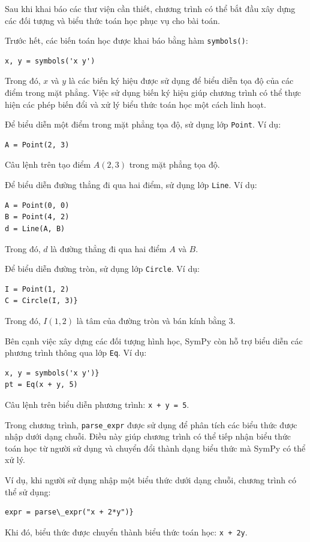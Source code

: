 \documentclass[12pt,a4paper]{article}
\begin{document}
Sau khi khai báo các thư viện cần thiết, chương trình có thể bắt đầu xây dựng các đối tượng và biểu thức toán học phục vụ cho bài toán.

Trước hết, các biến toán học được khai báo bằng hàm \texttt{symbols()}: 
\begin{lstlisting}
x, y = symbols('x y')
\end{lstlisting}
Trong đó, $x$ và $y$ là các biến ký hiệu được sử dụng để biểu diễn tọa độ của các điểm trong mặt phẳng. Việc sử dụng biến ký hiệu giúp chương trình có thể thực hiện các phép biến đổi và xử lý biểu thức toán học một cách linh hoạt.

Để biểu diễn một điểm trong mặt phẳng tọa độ, sử dụng lớp \texttt{Point}. Ví dụ: 
\begin{lstlisting}
A = Point(2, 3)
\end{lstlisting}
Câu lệnh trên tạo điểm $A(2,3)$ trong mặt phẳng tọa độ.

Để biểu diễn đường thẳng đi qua hai điểm, sử dụng lớp \texttt{Line}. Ví dụ:
\begin{lstlisting}
A = Point(0, 0)
B = Point(4, 2)
d = Line(A, B)
\end{lstlisting}
Trong đó, $d$ là đường thẳng đi qua hai điểm $A$ và $B$.

Để biểu diễn đường tròn, sử dụng lớp \texttt{Circle}. Ví dụ: 
\begin{lstlisting}
I = Point(1, 2)
C = Circle(I, 3)}
\end{lstlisting}
Trong đó, $I(1,2)$ là tâm của đường tròn và bán kính bằng $3$.

Bên cạnh việc xây dựng các đối tượng hình học, SymPy còn hỗ trợ biểu diễn các phương trình thông qua lớp \texttt{Eq}. Ví dụ:
\begin{lstlisting}
x, y = symbols('x y')}
pt = Eq(x + y, 5)
\end{lstlisting}
Câu lệnh trên biểu diễn phương trình: \texttt{x + y = 5}.

Trong chương trình, \texttt{parse\_expr} được sử dụng để phân tích các biểu thức được nhập dưới dạng chuỗi. Điều này giúp chương trình có thể tiếp nhận biểu thức toán học từ người sử dụng và chuyển đổi thành dạng biểu thức mà SymPy có thể xử lý.

Ví dụ, khi người sử dụng nhập một biểu thức dưới dạng chuỗi, chương trình có thể sử dụng:
\begin{lstlisting}
expr = parse\_expr("x + 2*y")}
\end{lstlisting}
Khi đó, biểu thức được chuyển thành biểu thức toán học:
\texttt{x + 2y}.
\end{document}
